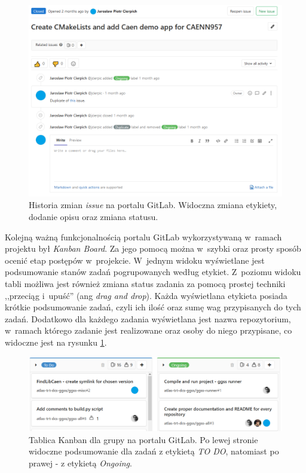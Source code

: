 \begin{figure}[H]
\centering
\includegraphics[width=\textwidth]{res/png/issueOngoing}
\caption{Historia zmian \textit{issue} na portalu GitLab. Widoczna zmiana etykiety, dodanie opisu oraz zmiana statusu.}
\end{figure}

\newpage

Kolejną ważną funkcjonalnością portalu GitLab wykorzystywaną w~ramach projektu był \textit{Kanban Board}. Za jego pomocą można w~szybki oraz prosty sposób ocenić etap postępów w~projekcie. W~jednym widoku wyświetlane jest podsumowanie stanów zadań pogrupowanych według etykiet. Z~poziomu widoku tabli możliwa jest również zmiana status zadania za pomocą prostej techniki ,,przeciąg i~upuść'' (ang \textit{drag and drop}). Każda wyświetlana etykieta posiada krótkie podsumowanie zadań, czyli ich ilość oraz sumę wag przypisanych do tych zadań. Dodatkowo dla każdego zadania wyświetlana jest nazwa repozytorium, w~ramach którego zadanie jest realizowane oraz osoby do niego przypisane, co widoczne jest na rysunku \ref{fig:kanban}.

\begin{figure}[H]
\centering
\includegraphics[width=\textwidth]{res/png/kanban}
\caption{Tablica Kanban dla grupy na portalu GitLab. Po lewej stronie widoczne podsumowanie dla zadań z etykietą \textit{TO DO}, natomiast po prawej - z etykietą \textit{Ongoing}.}
\label{fig:kanban}
\end{figure}


